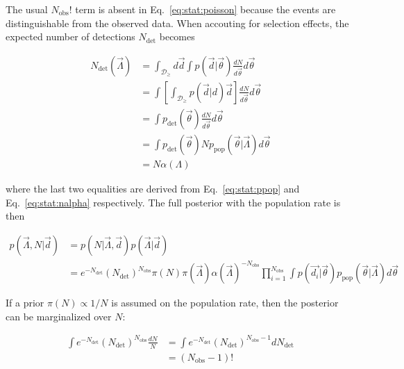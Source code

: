 \documentclass[%
preprint,
nofootinbib,
 amsmath,amssymb,
 aps,
]{revtex4-2}
\newcommand{\given}[2]{p( #1 | #2 )}
\newcommand{\ppop}[0]{p_{\text{pop}}}
\newcommand{\pdet}[0]{p_{\text{det}}}
\newcommand{\ndet}[0]{N_{\text{det}}}
\newcommand{\nobs}[0]{N_{\text{obs}}}
\begin{document}
The usual $\nobs !$ term is absent in Eq.~\eqref{eq:stat:poisson} because the events are
distinguishable from the observed data. When accouting for selection effects, the expected number
of detections $\ndet$ becomes

\begin{align}
	\ndet(\vec{\Lambda}) & = \int_{\mathcal{D}_\geq}  d\vec{d} \int \given{\vec{d}}{\vec{\theta}} \frac{dN}{d\vec{\theta}} d\vec{\theta} \\
	                     & = \int \left[ \int_{\mathcal{D}_\geq} \given{\vec{d}} d\vec{d} \right]\frac{dN}{d\vec{\theta}} d\vec{\theta}  \\
	                     & = \int \pdet(\vec{\theta})\frac{dN}{d\vec{\theta}} d\vec{\theta}                                              \\
	                     & = \int \pdet(\vec{\theta}) N \ppop(\vec{\theta} | \vec{\Lambda}) d\vec{\theta}                                \\
	                     & = N \alpha(\Lambda)
\end{align}

where the last two equalities are derived from Eq.~\eqref{eq:stat:ppop} and
Eq.~\eqref{eq:stat:nalpha} respectively. The full posterior with the population rate is then

\begin{align}
	\nonumber
	\given{\vec{\Lambda}, N }{\vec{d}} & = \given{N}{\vec{\Lambda}, \vec{d}}\given{\vec{\Lambda}}{\vec{d}}                    \\
	\label{eq:stat:full-hierarchical-posterior}
	                                   & = e^{-\ndet}(\ndet)^{\nobs} \pi(N) \pi(\vec{\Lambda}) \alpha(\vec{\Lambda})^{-\nobs}
	\prod_{i=1}^{\nobs} \int \given{\vec{d_i}}{\vec{\theta}} \ppop(\vec{\theta} | \vec{\Lambda} ) d\vec{\theta}
\end{align}

If a prior $\pi(N) \propto 1/N$ is assumed on the population rate, then the posterior can be
marginalized over $N$:

\begin{align}
	\int e^{-\ndet}(\ndet)^{\nobs} \frac{dN}{N} & = \int e^{-\ndet}(\ndet)^{\nobs - 1} d\ndet \\
	                                            & = (\nobs - 1)!
\end{align}
\end{document}

